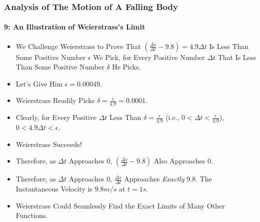 \begin{frame}
\frametitle{Analysis of The Motion of \alert{A Falling Body}}
\framesubtitle{9: An Illustration of Weierstrass's Limit}
\label{slide:analysis-of-falling-body-9}
\begin{itemize}
\pause
\item We Challenge Weierstrass to Prove That $(\frac{\Delta s}{\Delta t}-9.8)=4.9\Delta t$ Is Less Than Some Positive Number $\epsilon$ We Pick, for Every Positive Number $\Delta t$ That Is Less Than Some Positive Number $\delta$ He Picks.
\pause
\item Let's Give Him $\epsilon=0.00049$.
\pause
\item Weierstrass Readily Picks $\delta=\frac{\epsilon}{4.9}=0.0001$.
\pause
\item Clearly, for Every Positive $\Delta t$ Less Than $\delta=\frac{\epsilon}{4.9}$ (i.e., $0<\Delta t<\frac{\epsilon}{4.9}$), $0<4.9\Delta t<\epsilon$.
\pause
\item Weierstrass Succeeds!
\pause
\item Therefore, \alert{as $\Delta t$ Approaches 0, $(\frac{\Delta s}{\Delta t}-9.8)$ Also Approaches 0}.
\pause
\item Therefore, \alert{as $\Delta t$ Approaches 0, $\frac{\Delta s}{\Delta t}$ Approaches \textit{Exactly} 9.8}. The Instantaneous Velocity is $9.8 m/s$ at $t=1s$.
\pause
\item Weierstrass Could Seamlessly Find the Exact Limits of Many Other Functions.
\end{itemize}
\end{frame}
